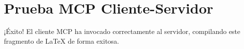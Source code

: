 \documentclass{article}
\begin{document}
\section*{Prueba MCP Cliente-Servidor}
¡Éxito! El cliente MCP ha invocado correctamente al servidor, compilando este fragmento de LaTeX de forma exitosa.
\end{document}
